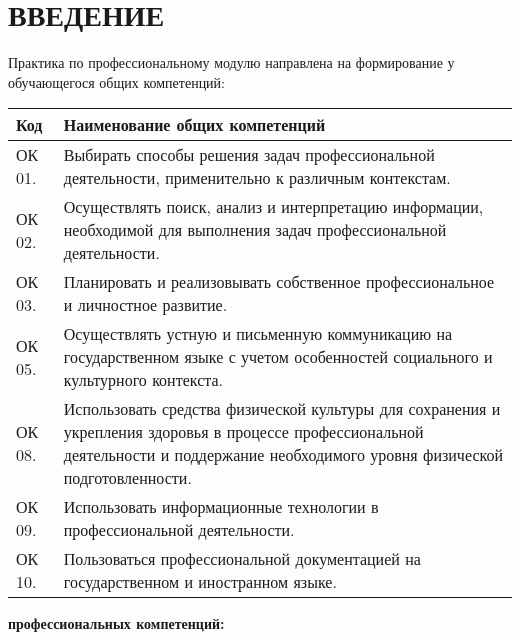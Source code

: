 \chapter*{ВВЕДЕНИЕ}

Практика по профессиональному модулю \textbf{\module}
направлена на формирование у обучающегося общих компетенций:
\\


\begin{tabular}{|l|m{125mm}|}
    \hline
    \textbf{Код} & \textbf{Наименование общих компетенций}\\

    \hline
    ОК 01. & Выбирать способы решения задач профессиональной деятельности, применительно к различным контекстам.\\

    \hline
    ОК 02. & Осуществлять поиск, анализ и интерпретацию информации, необходимой для выполнения задач профессиональной деятельности.\\

    \hline
    ОК 03. & Планировать и реализовывать собственное профессиональное и личностное развитие.\\

    \hline
    ОК 05. & Осуществлять устную и письменную коммуникацию на государственном языке с учетом особенностей социального и культурного контекста.\\

    \hline
    ОК 08. & Использовать средства физической культуры для сохранения и укрепления здоровья в процессе профессиональной деятельности и поддержание необходимого уровня физической подготовленности.\\

    \hline
    ОК 09. & Использовать информационные технологии в профессиональной деятельности.\\

    \hline
    ОК 10. & Пользоваться профессиональной документацией на государственном и иностранном языке.\\

    \hline
\end{tabular}

\clearpage
\textbf{профессиональных компетенций:}
\\


